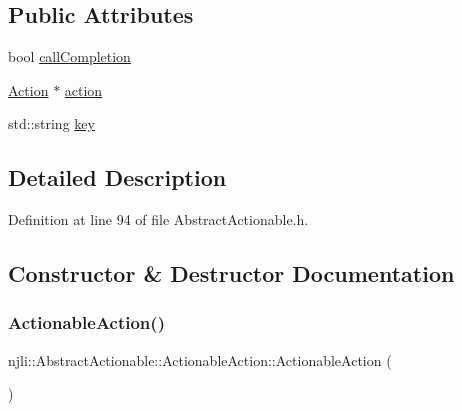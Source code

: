 \subsection*{Public Attributes}
\begin{DoxyCompactItemize}
\item 
bool \mbox{\hyperlink{structnjli_1_1_abstract_actionable_1_1_actionable_action_acfd8e38d1a51229d6da90dccd2f96ffd}{call\+Completion}}
\item 
\mbox{\hyperlink{classnjli_1_1_action}{Action}} $\ast$ \mbox{\hyperlink{structnjli_1_1_abstract_actionable_1_1_actionable_action_ab851715245b788c049ee57f5cb100e52}{action}}
\item 
std\+::string \mbox{\hyperlink{structnjli_1_1_abstract_actionable_1_1_actionable_action_a6d5c613f063f9de4c8d998feb1ac9434}{key}}
\end{DoxyCompactItemize}


\subsection{Detailed Description}


Definition at line 94 of file Abstract\+Actionable.\+h.



\subsection{Constructor \& Destructor Documentation}
\mbox{\label{structnjli_1_1_abstract_actionable_1_1_actionable_action_ab9c1588b35748040376c7fd9af9b517b}} 
\subsubsection{\texorpdfstring{Actionable\+Action()}{ActionableAction()}}
{\footnotesize\ttfamily njli\+::\+Abstract\+Actionable\+::\+Actionable\+Action\+::\+Actionable\+Action (\begin{DoxyParamCaption}{ }\end{DoxyParamCaption})\hspace{0.3cm}{\ttfamily [inline]}}



